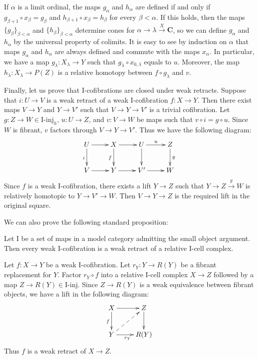 \documentclass{tac}
\theoremstyle{definition}
\newcommand{\cat}[1]{\mathbf{#1}}
\newcommand{\C}{\cat{C}}
\newcommand{\I}{\mathrm{I}}
\newcommand{\class}[2]{#1\text{-}\mathrm{#2}}
\newcommand{\Iinj}[1][\I]{\class{#1}{inj}}
\begin{document}
If $\alpha$ is a limit ordinal, the maps $g_\alpha$ and $h_\alpha$ are defined if and only if $g_{\beta+1} \circ x_\beta = g_\beta$ and $h_{\beta+1} \circ x_\beta = h_\beta$ for every $\beta < \alpha$.
If this holds, then the maps $\{ g_\beta \}_{\beta < \alpha}$ and $\{ h_\beta \}_{\beta < \alpha}$ determine cones for $\alpha \to \lambda \xrightarrow{X} \C$,
so we can define $g_\alpha$ and $h_\alpha$ by the universal property of colimits.
It is easy to see by induction on $\alpha$ that maps $g_\alpha$ and $h_\alpha$ are always defined and commute with the maps $x_\alpha$.
In particular, we have a map $g_\lambda : X_\lambda \to Y$ such that $g_\lambda \circ x_{0,\lambda}$ equals to $u$.
Moreover, the map $h_\lambda : X_\lambda \to P(Z)$ is a relative homotopy between $f \circ g_\lambda$ and $v$.

Finally, let us prove that $\I$-cofibrations are closed under weak retracts.
Suppose that $i : U \to V$ is a weak retract of a weak $\I$-cofibration $f : X \to Y$.
Then there exist maps $V \to Y$ and $Y \to V'$ such that $V \to Y \to V'$ is a trivial cofibration.
Let $g : Z \to W \in \Iinj_h$, $u : U \to Z$, and $v : V \to W$ be maps such that $v \circ i = g \circ u$.
Since $W$ is fibrant, $v$ factors through $V \to Y \to V'$.
Thus we have the following diagram:
\[ \xymatrix{ U \ar[r] \ar[d]_i & X \ar[r] \ar[d]_f & U \ar[r]^u \ar[d] & Z \ar[d]^g \\
              V \ar[r]          & Y \ar[r]          & V' \ar[r]         & W
            } \]
Since $f$ is a weak $\I$-cofibration, there exists a lift $Y \to Z$ such that $Y \to Z \xrightarrow{g} W$ is relatively homotopic to $Y \to V' \to W$.
Then $V \to Y \to Z$ is the required lift in the original square.
\endproof

We can also prove the following standard proposition:

\begin{prop}
Let $\I$ be a set of maps in a model category admitting the small object argument.
Then every weak $\I$-cofibration is a weak retract of a relative $\I$-cell complex.
\end{prop}
\proof
Let $f : X \to Y$ be a weak $\I$-cofibration.
Let $r_Y : Y \to R(Y)$ be a fibrant replacement for $Y$.
Factor $r_Y \circ f$ into a relative $\I$-cell complex $X \to Z$ followed by a map $Z \to R(Y) \in \Iinj$.
Since $Z \to R(Y)$ is a weak equivalence between fibrant objects, we have a lift in the following diagram:
\[ \xymatrix{ X \ar[r] \ar[d]_f             & Z \ar[d] \\
              Y \ar[r]_{r_Y} \ar@{-->}[ur]  & R(Y)
            } \]
Thus $f$ is a weak retract of $X \to Z$.
\endproof
\end{document}
